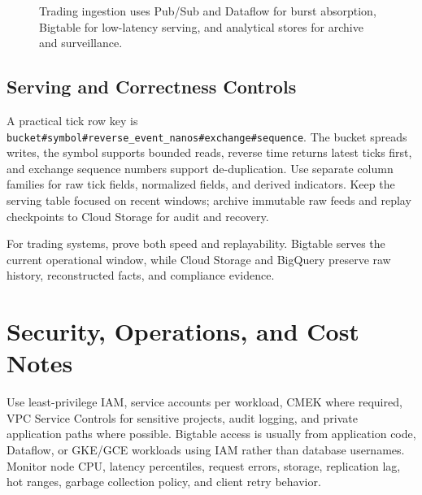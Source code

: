 \begin{figure}[H]
{%
    }
    \caption{Trading ingestion uses Pub/Sub and Dataflow for burst absorption, Bigtable for low-latency serving, and analytical stores for archive and surveillance.}
    \label{fig:bigtable-trading-serving-layer}
\end{figure}

\subsection{Serving and Correctness Controls}
A practical tick row key is \texttt{bucket\#symbol\#reverse\_event\_nanos\#exchange\#sequence}. The bucket spreads writes, the symbol supports bounded reads, reverse time returns latest ticks first, and exchange sequence numbers support de-duplication. Use separate column families for raw tick fields, normalized fields, and derived indicators. Keep the serving table focused on recent windows; archive immutable raw feeds and replay checkpoints to Cloud Storage for audit and recovery.

\begin{tipbox}
For trading systems, prove both speed and replayability. Bigtable serves the current operational window, while Cloud Storage and BigQuery preserve raw history, reconstructed facts, and compliance evidence.
\end{tipbox}

\section{Security, Operations, and Cost Notes}
Use least-privilege IAM, service accounts per workload, CMEK where required, VPC Service Controls for sensitive projects, audit logging, and private application paths where possible. Bigtable access is usually from application code, Dataflow, or GKE/GCE workloads using IAM rather than database usernames. Monitor node CPU, latency percentiles, request errors, storage, replication lag, hot ranges, garbage collection policy, and client retry behavior.

